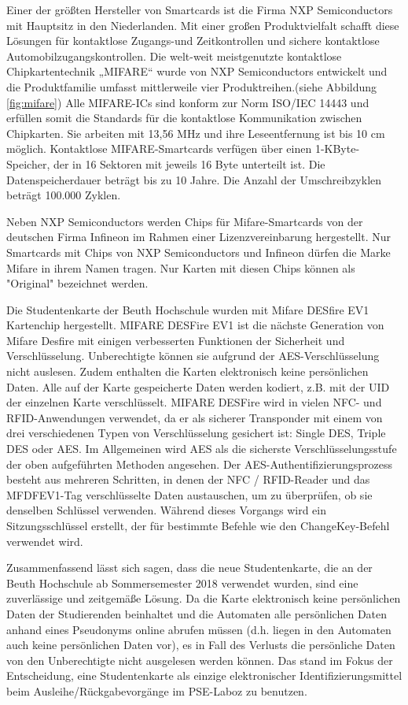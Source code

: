 Einer der größten Hersteller von Smartcards ist die Firma NXP Semiconductors mit Hauptsitz in den Niederlanden. Mit einer großen Produktvielfalt schafft diese Lösungen für kontaktlose Zugangs-und Zeitkontrollen und sichere kontaktlose Automobilzugangskontrollen. Die welt-weit meistgenutzte kontaktlose Chipkartentechnik „MIFARE“ wurde von NXP Semiconductors entwickelt und die Produktfamilie umfasst mittlerweile vier Produktreihen.(siehe Abbildung \ref{fig:mifare})\cite{website:9} Alle MIFARE-ICs sind konform zur Norm ISO/IEC 14443 und erfüllen somit die Standards für die kontaktlose Kommunikation zwischen Chipkarten. Sie arbeiten mit 13,56 MHz und ihre Leseentfernung ist bis 10 cm möglich. Kontaktlose MIFARE-Smartcards verfügen über einen 1-KByte-Speicher, der in 16 Sektoren mit jeweils 16 Byte unterteilt ist. Die Datenspeicherdauer beträgt bis zu 10 Jahre. Die Anzahl der Umschreibzyklen beträgt 100.000 Zyklen.

Neben NXP Semiconductors werden Chips für Mifare-Smartcards von der deutschen Firma Infineon im Rahmen einer Lizenzvereinbarung hergestellt\cite{website:11}. Nur Smartcards mit Chips von NXP Semiconductors und Infineon dürfen die Marke Mifare in ihrem Namen tragen. Nur Karten mit diesen Chips können als "Original" bezeichnet werden.

Die Studentenkarte der Beuth Hochschule wurden mit Mifare DESfire EV1 Kartenchip hergestellt. MIFARE DESFire EV1 ist die nächste Generation von Mifare Desfire mit einigen verbesserten Funktionen der Sicherheit und Verschlüsselung\cite[p.83]{chirico:smart_card}. Unberechtigte können sie aufgrund der AES-Verschlüsselung nicht auslesen. Zudem enthalten die Karten elektronisch keine persönlichen Daten\cite{website:12}. Alle auf der Karte gespeicherte Daten werden kodiert, z.B. mit der UID der einzelnen Karte verschlüsselt. MIFARE DESFire wird in vielen NFC- und RFID-Anwendungen verwendet, da er als sicherer Transponder mit einem von drei verschiedenen Typen von Verschlüsselung gesichert ist: Single DES, Triple DES oder AES. Im Allgemeinen wird AES als die sicherste Verschlüsselungsstufe der oben aufgeführten Methoden angesehen. Der AES-Authentifizierungsprozess besteht aus mehreren Schritten, in denen der NFC / RFID-Reader und das MFDFEV1-Tag verschlüsselte Daten austauschen, um zu überprüfen, ob sie denselben Schlüssel verwenden. Während dieses Vorgangs wird ein Sitzungsschlüssel erstellt, der für bestimmte Befehle wie den ChangeKey-Befehl verwendet wird\cite{website:10}.

Zusammenfassend lässt sich sagen, dass die neue Studentenkarte, die an der Beuth Hochschule ab Sommersemester 2018 verwendet wurden, sind eine zuverlässige und zeitgemäße Lösung. Da die Karte elektronisch keine persönlichen Daten der Studierenden beinhaltet und die Automaten alle persönlichen Daten anhand eines Pseudonyms online abrufen müssen (d.h. liegen in den Automaten auch keine persönlichen Daten vor), es in Fall des Verlusts die persönliche Daten von den Unberechtigte nicht ausgelesen werden können\cite{website:12}. Das stand im Fokus der Entscheidung, eine Studentenkarte als einzige elektronischer Identifizierungsmittel beim Ausleihe/Rückgabevorgänge im PSE-Laboz zu benutzen.



